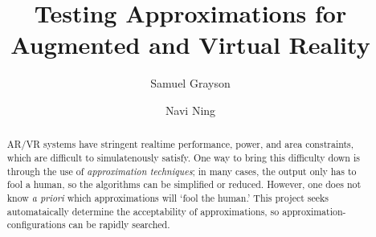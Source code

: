 \documentclass[screen,sigconf,nonacm]{acmart}
\begin{document}
\title{Testing Approximations for Augmented and Virtual Reality}

\author{Samuel Grayson}

\author{Navi Ning}

\renewcommand\footnotetextcopyrightpermission[1]{} %

\newcommand{\todo}[1]{}

\begin{abstract}
AR/VR systems have stringent realtime performance, power, and area constraints, which are difficult to simulatenously satisfy.
One way to bring this difficulty down is through the use of \textit{approximation techniques};
    in many cases, the output only has to fool a human, so the algorithms can be simplified or reduced.
However, one does not know \textit{a priori} which approximations will `fool the human.'
This project seeks automataically determine the acceptability of approximations, so approximation-configurations can be rapidly searched.
\end{abstract}




\maketitle





\end{document}

